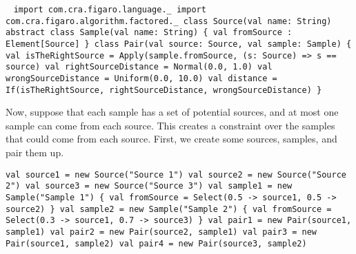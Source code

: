 \begin{flushleft}\
\texttt{import com.cra.figaro.language.\_
\newline import com.cra.figaro.algorithm.factored.\_
\newline 
\newline class Source(val name: String)
\newline 
\newline abstract class Sample(val name: String) \{
\newline \tab val fromSource : Element[Source]
\newline \}
\newline 
\newline class Pair(val source: Source, val sample: Sample) \{
\newline \tab val isTheRightSource =
\newline \tab Apply(sample.fromSource, (s: Source) => s == source)
\newline \tab val rightSourceDistance = Normal(0.0, 1.0) 
\newline \tab val wrongSourceDistance = Uniform(0.0, 10.0) 
\newline \tab val distance =
\newline \tab If(isTheRightSource, rightSourceDistance, wrongSourceDistance)
\newline \}
}
\end{flushleft}

Now, suppose that each sample has a set of potential sources, and at most one sample can come from each source. This creates a constraint over the samples that could come from each source.  First, we create some sources, samples, and pair them up.

\begin{flushleft}
\texttt{val source1 = new Source("Source 1") 
\newline val source2 = new Source("Source 2") 
\newline val source3 = new Source("Source 3") 
\newline 
\newline val sample1 = new Sample("Sample 1") \{
\newline \tab val fromSource = Select(0.5 -> source1, 0.5 -> source2)
\newline \}
\newline val sample2 = new Sample("Sample 2") \{
\newline \tab val fromSource = Select(0.3 -> source1, 0.7 -> source3)
\newline \}
\newline 
\newline val pair1 = new Pair(source1, sample1) 
\newline val pair2 = new Pair(source2, sample1) 
\newline val pair3 = new Pair(source1, sample2) 
\newline val pair4 = new Pair(source3, sample2)}
\end{flushleft}

